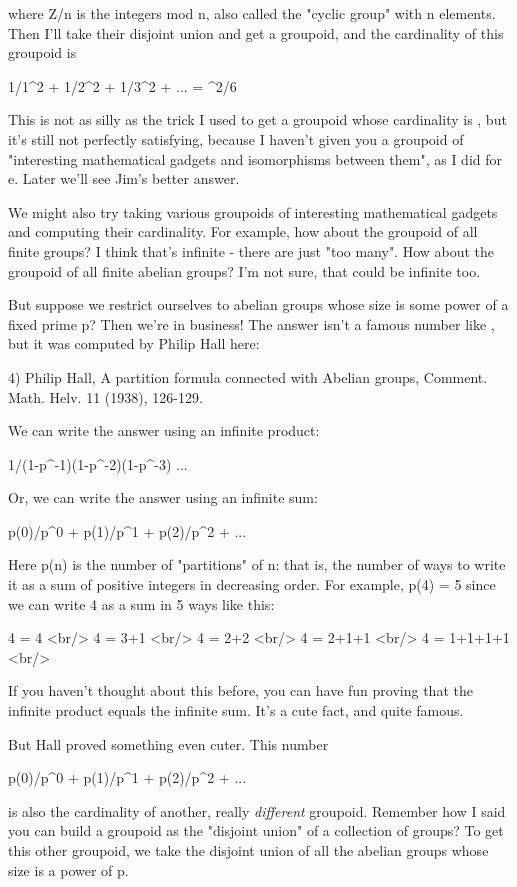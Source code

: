 where Z/n is the integers mod n, also called the "cyclic group"
with n elements.  Then I'll take their disjoint union and get a
groupoid, and the cardinality of this groupoid is

1/1^{2} + 1/2^{2} + 1/3^{2} + ... = \pi ^{2}/6

This is not as silly as the trick I used to get a groupoid whose
cardinality is \pi , but it's still not perfectly satisfying, because
I haven't given you a groupoid of "interesting mathematical gadgets
and isomorphisms between them", as I did for e.  Later we'll see Jim's
better answer.

We might also try taking various groupoids of interesting
mathematical gadgets and computing their cardinality.  For example,
how about the groupoid of all finite groups?  I think that's infinite
- there are just "too many".  How about the groupoid of all finite
abelian groups?  I'm not sure, that could be infinite too.

But suppose we restrict ourselves to abelian groups whose size is
some power of a fixed prime p?  Then we're in business!  The answer
isn't a famous number like \pi , but it was computed by Philip Hall
here:

4) Philip Hall, A partition formula connected with Abelian groups,
Comment. Math. Helv. 11 (1938), 126-129.

We can write the answer using an infinite product:

1/(1-p^{-1})(1-p^{-2})(1-p^{-3}) ...

Or, we can write the answer using an infinite sum:

p(0)/p^{0} + p(1)/p^{1} + p(2)/p^{2} + ...

Here p(n) is the number of "partitions" of n: that is, the number
of ways to write it as a sum of positive integers in decreasing order.
For example, p(4) = 5 since we can write 4 as a sum in 5 ways like
this:

4 = 4  <br/>
4 = 3+1  <br/>
4 = 2+2   <br/>
4 = 2+1+1   <br/>
4 = 1+1+1+1   <br/>

If you haven't thought about this before, you can have fun proving
that the infinite product equals the infinite sum.  It's a cute fact,
and quite famous.

But Hall proved something even cuter. This number

p(0)/p^{0} + p(1)/p^{1} + p(2)/p^{2} + ...

is also the cardinality of another, really \emph{different}
groupoid.  Remember how I said you can build a groupoid as the
"disjoint union" of a collection of groups?  To get this other
groupoid, we take the disjoint union of all the abelian groups whose
size is a power of p.

